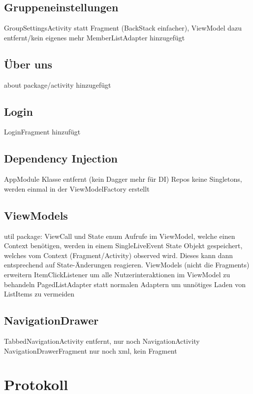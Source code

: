 \documentclass[parskip=full,11pt]{scrartcl}
\begin{document}
\subsection{Gruppeneinstellungen}
GroupSettingsActivity statt Fragment (BackStack einfacher), ViewModel dazu entfernt/kein eigenes mehr
MemberListAdapter hinzugefügt

\subsection{Über uns}
about package/activity hinzugefügt

\subsection{Login}
LoginFragment hinzufügt

\subsection{Dependency Injection}
AppModule Klasse entfernt (kein Dagger mehr für DI)
Repos keine Singletons, werden einmal in der ViewModelFactory erstellt

\subsection{ViewModels}
util package: ViewCall und State enum
Aufrufe im ViewModel, welche einen Context benötigen, werden in einem SingleLiveEvent State Objekt gespeichert, welches vom Context (Fragment/Activity) observed wird. Dieses kann dann entsprechend auf State-Änderungen reagieren.
ViewModels (nicht die Fragments) erweitern ItemClickListener um alle Nutzerinteraktionen im ViewModel zu behandeln
PagedListAdapter statt normalen Adaptern um unnötiges Laden von ListItems zu vermeiden

\subsection{NavigationDrawer}
TabbedNavigationActivity entfernt, nur noch NavigationActivity
NavigationDrawerFragment nur noch xml, kein Fragment


\pagebreak
\section{Protokoll}
\end{document}
